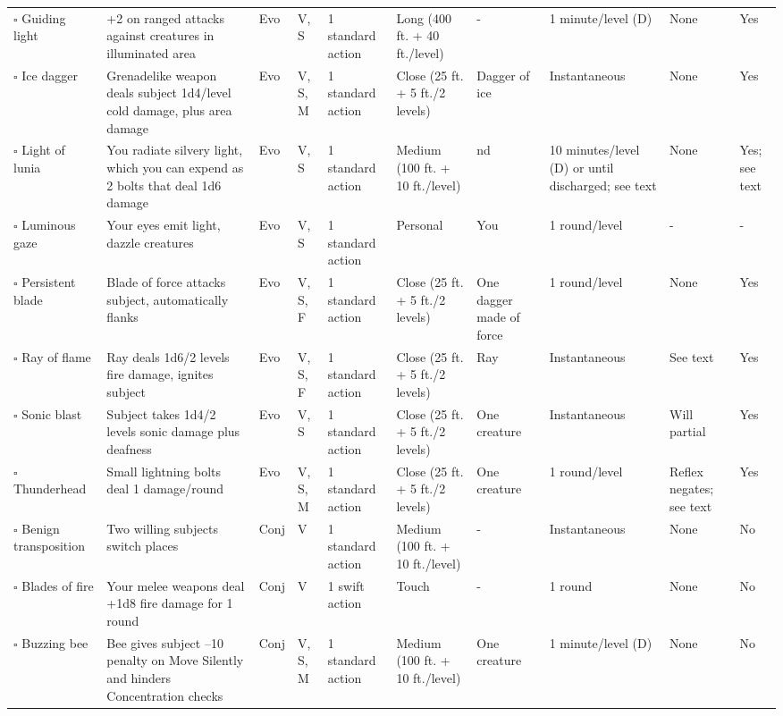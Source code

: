 \documentclass[12pt, a4paper]{article}
\begin{document}
\begin{center}
\begin{longtable}[H]{ p{8em} p{15em} p{2em} p{5em} p{6em} p{6em} p{10em} p{6em} p{5em} p{2em} }
    \(\square\) Guiding light & +2 on ranged attacks against creatures in illuminated area & Evo & V, S & 1 standard action & Long (400 ft. + 40 ft./level) & - & 1 minute/level (D) & None & Yes\\
    \(\square\) Ice dagger & Grenadelike weapon deals subject 1d4/level cold damage, plus area damage & Evo & V, S, M & 1 standard action & Close (25 ft. + 5 ft./2 levels) & Dagger of ice & Instantaneous & None & Yes\\
    \(\square\) Light of lunia & You radiate silvery light, which you can expend as 2 bolts that deal 1d6 damage & Evo & V, S & 1 standard action & Medium (100 ft. + 10 ft./level) & nd  & 10 minutes/level (D) or until discharged; see text & None & Yes; see text\\
    \(\square\) Luminous gaze & Your eyes emit light, dazzle creatures & Evo & V, S & 1 standard action & Personal & You & 1 round/level & - & -\\
    \(\square\) Persistent blade & Blade of force attacks subject, automatically ﬂanks & Evo & V, S, F & 1 standard action & Close (25 ft. + 5 ft./2 levels) & One dagger made of force & 1 round/level & None & Yes\\
    \(\square\) Ray of flame & Ray deals 1d6/2 levels ﬁre damage, ignites subject & Evo & V, S, F & 1 standard action & Close (25 ft. + 5 ft./2 levels) & Ray & Instantaneous & See text & Yes\\
    \(\square\) Sonic blast & Subject takes 1d4/2 levels sonic damage plus deafness & Evo & V, S & 1 standard action & Close (25 ft. + 5 ft./2 levels) & One creature & Instantaneous & Will partial & Yes\\
    \(\square\) Thunderhead & Small lightning bolts deal 1 damage/round & Evo & V, S, M & 1 standard action & Close (25 ft. + 5 ft./2 levels) & One creature & 1 round/level & Reﬂex negates; see text & Yes\\
    \(\square\) Benign transposition & Two willing subjects switch places & Conj & V & 1 standard action & Medium (100 ft. + 10 ft./level) & - & Instantaneous & None & No\\
    \(\square\) Blades of fire & Your melee weapons deal +1d8 ﬁre damage for 1 round & Conj & V & 1 swift action & Touch & - & 1 round & None & No\\
    \(\square\) Buzzing bee & Bee gives subject –10 penalty on Move Silently and hinders Concentration checks & Conj & V, S, M & 1 standard action & Medium (100 ft. + 10 ft./level) & One creature & 1 minute/level (D) & None & No\\

\end{longtable}
\end{center}
\end{document}

